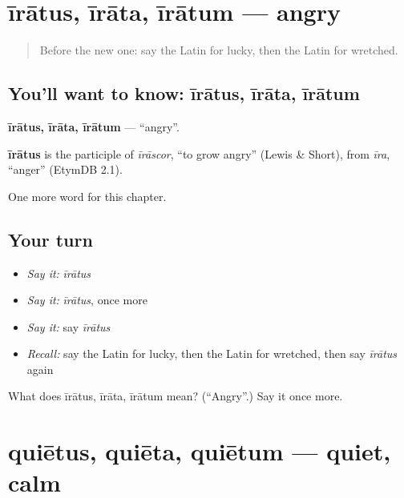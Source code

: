 \section[īrātus, īrāta, īrātum]{īrātus, īrāta, īrātum — angry}

\label{lesson:LA-C148-iratus}



\begin{quote}
Before the new one: say the Latin for lucky, then the Latin for wretched.
\end{quote}

\subsection*{You'll want to know: īrātus, īrāta, īrātum}
\textbf{īrātus, īrāta, īrātum} — \textquotedblleft{}angry\textquotedblright{}.

\begin{cousinweb}
\textbf{īrātus} is the participle of \emph{īrāscor}, \textquotedblleft{}to grow angry\textquotedblright{} (Lewis \& Short), from \emph{īra}, \textquotedblleft{}anger\textquotedblright{} (EtymDB 2.1).
\end{cousinweb}

\begin{grammarlens}[title={What you've built}]
One more word for this chapter.
\end{grammarlens}

\subsection*{Your turn}
\begin{itemize}
\raggedright
  \item \emph{Say it:} \emph{īrātus}
  \item \emph{Say it:} \emph{īrātus}, once more
  \item \emph{Say it:} say \emph{īrātus}
  \item \emph{Recall:} say the Latin for lucky, then the Latin for wretched, then say \emph{īrātus} again
\end{itemize}

\begin{tcolorbox}[breakable,colback=teal!4,colframe=teal!35!black,title={Before you move on}]
What does īrātus, īrāta, īrātum mean? (\textquotedblleft{}Angry\textquotedblright{}.) Say it once more.
\end{tcolorbox}
\section[quiētus, quiēta, quiētum]{quiētus, quiēta, quiētum — quiet, calm}

